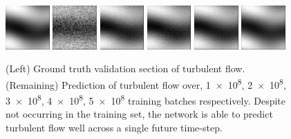 \documentclass[10pt,letterpaper]{report}
\begin{document}
\begin{figure}
	\begin{center}
		\includegraphics[width=0.15\textwidth]{images/prediction/labe.png}
		\includegraphics[width=0.15\textwidth]{images/prediction/5.png}
		\includegraphics[width=0.15\textwidth]{images/prediction/10.png}
		\includegraphics[width=0.15\textwidth]{images/prediction/15.png}
		\includegraphics[width=0.15\textwidth]{images/prediction/20.png}
		\includegraphics[width=0.15\textwidth]{images/prediction/25.png}
		\caption{\small (Left) Ground truth validation section of turbulent flow. (Remaining) Prediction of turbulent flow over, \num{1e+8}, \num{2e+8}, \num{3e+8}, \num{4e+8}, \num{5e+8} training batches respectively. Despite not occurring in the training set, the network is able to predict turbulent flow well across a single future time-step.}
		\label{mean_error}
	\end{center}	
\end{figure}
\end{document}
